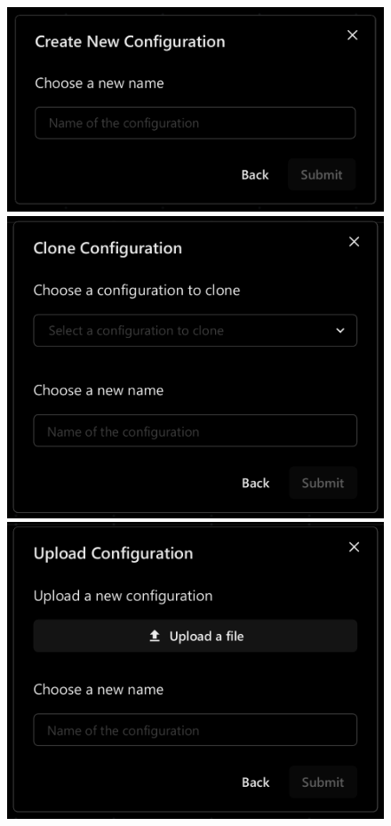 \begin{figure}[!ht]
   \begin{minipage}{0.4\textwidth}
     \centering
     \includegraphics[width=.9\linewidth]{Figures/configurations-page/create-new-crop.pdf}
   \end{minipage}
   \hspace{0.01cm}
   \begin{minipage}{0.27\textwidth}
     \centering
     \includegraphics[width=.9\linewidth]{Figures/configurations-page/clone-crop.pdf}
   \end{minipage}
   \hspace{0.05cm}
   \begin{minipage}{0.275\textwidth}
     \centering
     \includegraphics[width=.9\linewidth]{Figures/configurations-page/upload-crop.pdf}

\end{minipage}
\end{figure}
